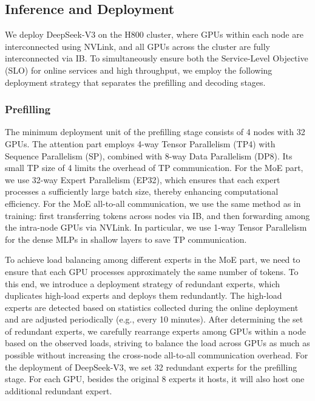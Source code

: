 \documentclass[11pt,a4paper]{article}
\begin{document}
\subsection{Inference and Deployment}

We deploy DeepSeek-V3 on the H800 cluster, where GPUs within each node are interconnected using NVLink, and all GPUs across the cluster are fully interconnected via IB. To simultaneously ensure both the Service-Level Objective (SLO) for online services and high throughput, we employ the following deployment strategy that separates the prefilling and decoding stages.

\subsubsection{Prefilling}

The minimum deployment unit of the prefilling stage consists of 4 nodes with 32 GPUs. The attention part employs 4-way Tensor Parallelism (TP4) with Sequence Parallelism (SP), combined with 8-way Data Parallelism (DP8). Its small TP size of 4 limits the overhead of TP communication. For the MoE part, we use 32-way Expert Parallelism (EP32), which ensures that each expert processes a sufficiently large batch size, thereby enhancing computational efficiency. For the MoE all-to-all communication, we use the same method as in training: first transferring tokens across nodes via IB, and then forwarding among the intra-node GPUs via NVLink. In particular, we use 1-way Tensor Parallelism for the dense MLPs in shallow layers to save TP communication.

To achieve load balancing among different experts in the MoE part, we need to ensure that each GPU processes approximately the same number of tokens. To this end, we introduce a deployment strategy of redundant experts, which duplicates high-load experts and deploys them redundantly. The high-load experts are detected based on statistics collected during the online deployment and are adjusted periodically (e.g., every 10 minutes). After determining the set of redundant experts, we carefully rearrange experts among GPUs within a node based on the observed loads, striving to balance the load across GPUs as much as possible without increasing the cross-node all-to-all communication overhead. For the deployment of DeepSeek-V3, we set 32 redundant experts for the prefilling stage. For each GPU, besides the original 8 experts it hosts, it will also host one additional redundant expert.
\end{document}
